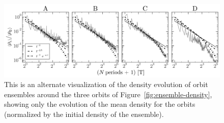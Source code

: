 \documentclass[letterpaper,12pt,preprint]{aastex}
\begin{document}
\clearpage
\begin{figure}[p]
\begin{center}
\includegraphics[width=\textwidth]{figures/ensemble-densities.png}
\caption{This is an alternate visualization of the density evolution of orbit ensembles around the three orbits of Figure~\ref{fig:ensemble-density}, showing only the evolution of the mean density for the orbits (normalized by the initial density of the ensemble). } 
\label{fig:densities}
\end{center}
\end{figure}
\end{document}
